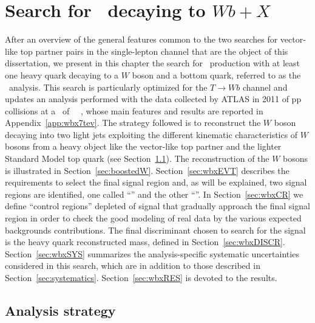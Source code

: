 \clearpage{\pagestyle{empty}\cleardoublepage}

\chapter{Search for \TTbar\ decaying to $Wb+X$}\label{chap:wbx}

After an overview of the general features
common to the two searches for vector-like top partner pairs
in the single-lepton channel that are the object of this dissertation,
we present in this chapter the search for \TTbar\ production with
at least one heavy quark decaying to a $W$ boson and a bottom
quark, referred to as the \wbx\ analysis.
This search is particularly optimized for the $T\to Wb$ channel
and updates an analysis performed with the data collected
by ATLAS in 2011 of pp collisions at a \cme\ of ~\tev~\cite{ATLAS:2012qe},
whose main features and results are reported in Appendix~\ref{app:wbx7tev}.
The strategy followed is to reconstruct the $W$ boson decaying
into two light jets exploiting the different kinematic characteristics
of $W$ bosons from a heavy object like the vector-like top partner
and the lighter Standard Model top quark (see Section~\ref{sec:wbxSTRAT}).
The reconstruction of the $W$ bosons is illustrated in
Section~\ref{sec:boostedW}.
Section~\ref{sec:wbxEVT} describes the requirements to select the
final signal region and, as will be explained, two signal regions are identified, 
one called ``\loose'' and the other ``\tight''.
In Section~\ref{sec:wbxCR} we define ``control regions'' depleted of
signal that gradually approach the final signal region in order to 
check the good modeling of real data by the various expected
backgrounds contributions. 
The final discriminant chosen to search for the signal is
the heavy quark reconstructed mass, defined in Section~\ref{sec:wbxDISCR}.
Section~\ref{sec:wbxSYS} summarizes the analysis-specific 
systematic uncertainties considered in this search, which are in addition to
those described in Section~\ref{sec:systematics}.
Section~\ref{sec:wbxRES} is devoted to the results.

\section{Analysis strategy}\label{sec:wbxSTRAT}

